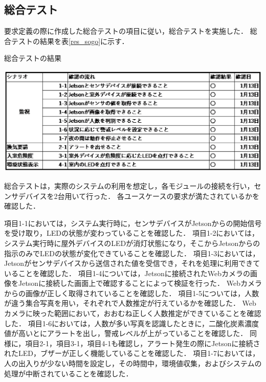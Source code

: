 

\subsection{総合テスト}
要求定義の際に作成した総合テストの項目に従い，総合テストを実施した．
総合テストの結果を表\ref{res_sogo}に示す．
\begin{table}[htbp]
    \centering
    \caption{総合テストの結果}
    \label{res_sogo}
    \includegraphics[width = 15cm]{./picture/sougoutest.eps}
\end{table}

総合テストは，実際のシステムの利用を想定し，各モジュールの接続を行い，センサデバイスを2台用いて行った．
各ユースケースの要求が満たされているかを確認した．

項目1-1においては，システム実行時に，センサデバイスがJetsonからの開始信号を受け取り，LEDの状態が変わっていることを確認した．
項目1-2においては，システム実行時に屋外デバイスのLEDが消灯状態になり，そこからJetsonからの指示のみでLEDの状態が変化できていることを確認した．
項目1-3においては，Jetsonがセンサデバイスから送信された値を受信でき，それを処理に利用できていることを確認した．
項目1-4については，Jetsonに接続されたWebカメラの画像をJetsonに接続した画面上で確認することによって検証を行った．
Webカメラからの画像が正しく取得されていることを確認した．
項目1-5については，人数が違う集合写真を用い，それぞれで人数推定が行えているかを確認した．
Webカメラに映った範囲において，おおむね正しく人数推定ができていることを確認した．
項目1-6においては，人数が多い写真を認識したときに，二酸化炭素濃度値が高いとにアラートを出し，警戒レベルが上がっていることを確認した．
同様に，項目2-1，項目3-1，項目4-1も確認し，アラート発生の際にJetsonに接続されたLED，ブザーが正しく機能していることを確認した．
項目1-7においては，人の出入りが少ない時間を設定し，その時間中，環境値収集，およびシステムの処理が中断されていることを確認した．

